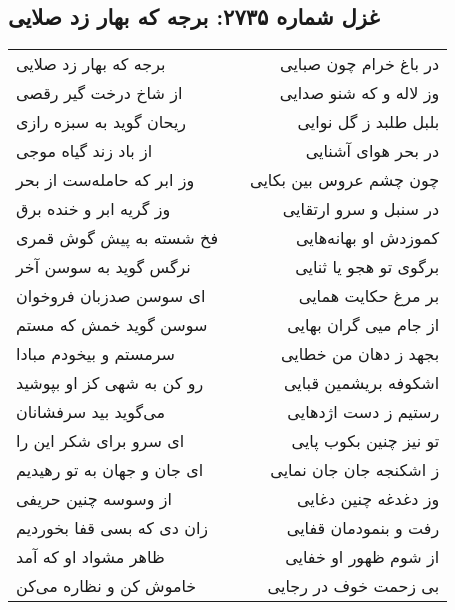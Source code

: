 \begin{center}
\section*{غزل شماره ۲۷۳۵: برجه که بهار زد صلایی}
\label{sec:2735}
\begin{longtable}{l p{0.5cm} r}
برجه که بهار زد صلایی
&&
در باغ خرام چون صبایی
\\
از شاخ درخت گیر رقصی
&&
وز لاله و که شنو صدایی
\\
ریحان گوید به سبزه رازی
&&
بلبل طلبد ز گل نوایی
\\
از باد زند گیاه موجی
&&
در بحر هوای آشنایی
\\
وز ابر که حامله‌ست از بحر
&&
چون چشم عروس بین بکایی
\\
وز گریه ابر و خنده برق
&&
در سنبل و سرو ارتقایی
\\
فخ شسته به پیش گوش قمری
&&
کموزدش او بهانه‌هایی
\\
نرگس گوید به سوسن آخر
&&
برگوی تو هجو یا ثنایی
\\
ای سوسن صدزبان فروخوان
&&
بر مرغ حکایت همایی
\\
سوسن گوید خمش که مستم
&&
از جام میی گران بهایی
\\
سرمستم و بیخودم مبادا
&&
بجهد ز دهان من خطایی
\\
رو کن به شهی کز او بپوشید
&&
اشکوفه بریشمین قبایی
\\
می‌گوید بید سرفشانان
&&
رستیم ز دست اژدهایی
\\
ای سرو برای شکر این را
&&
تو نیز چنین بکوب پایی
\\
ای جان و جهان به تو رهیدیم
&&
ز اشکنجه جان جان نمایی
\\
از وسوسه چنین حریفی
&&
وز دغدغه چنین دغایی
\\
زان دی که بسی قفا بخوردیم
&&
رفت و بنمودمان قفایی
\\
ظاهر مشواد او که آمد
&&
از شوم ظهور او خفایی
\\
خاموش کن و نظاره می‌کن
&&
بی زحمت خوف در رجایی
\\
\end{longtable}
\end{center}
